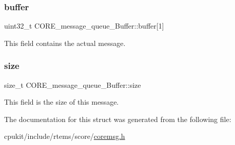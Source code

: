 \subsubsection{\texorpdfstring{buffer}{buffer}}
{\footnotesize\ttfamily uint32\+\_\+t C\+O\+R\+E\+\_\+message\+\_\+queue\+\_\+\+Buffer\+::buffer\mbox{[}1\mbox{]}}

This field contains the actual message. \mbox{\label{structCORE__message__queue__Buffer_a3d2e6882ac8a3d14030b3142404cea22}} 
\subsubsection{\texorpdfstring{size}{size}}
{\footnotesize\ttfamily size\+\_\+t C\+O\+R\+E\+\_\+message\+\_\+queue\+\_\+\+Buffer\+::size}

This field is the size of this message. 

The documentation for this struct was generated from the following file\+:\begin{DoxyCompactItemize}
\item 
cpukit/include/rtems/score/\mbox{\hyperlink{coremsg_8h}{coremsg.\+h}}\end{DoxyCompactItemize}
